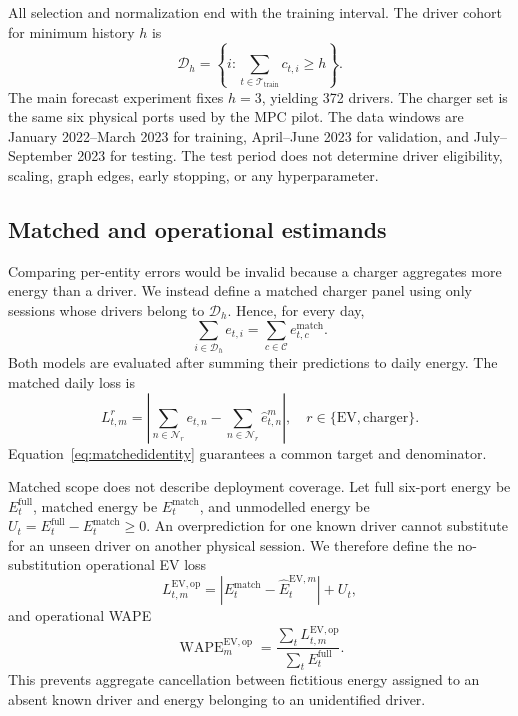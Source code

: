 \documentclass[11pt]{article}
\newcommand{\T}{\mathcal{T}}
\begin{document}
All selection and normalization end with the training interval.  The driver
cohort for minimum history \(h\) is
\begin{equation}
 \mathcal D_h=
 \left\{i:
 \sum_{t\in\T_{\mathrm{train}}}c_{t,i}\ge h
 \right\}.                                             \label{eq:drivercohort}
\end{equation}
The main forecast experiment fixes \(h=3\), yielding 372 drivers.  The charger
set is the same six physical ports used by the MPC pilot.  The data windows are
January 2022--March 2023 for training, April--June 2023 for validation, and
July--September 2023 for testing.  The test period does not determine driver
eligibility, scaling, graph edges, early stopping, or any hyperparameter.

\subsection{Matched and operational estimands}

Comparing per-entity errors would be invalid because a charger aggregates more
energy than a driver.  We instead define a matched charger panel using only
sessions whose drivers belong to \(\mathcal D_h\).  Hence, for every day,
\begin{equation}
 \sum_{i\in\mathcal D_h} e_{t,i}
 =
 \sum_{c\in\mathcal C} e^{\mathrm{match}}_{t,c}.          \label{eq:matchedidentity}
\end{equation}
Both models are evaluated after summing their predictions to daily energy.
The matched daily loss is
\begin{equation}
 L^{r}_{t,m}
 =
 \left|
 \sum_{n\in\mathcal N_r}e_{t,n}
 -
 \sum_{n\in\mathcal N_r}\widehat e^{m}_{t,n}
 \right|,
 \quad r\in\{\mathrm{EV},\mathrm{charger}\}.             \label{eq:matchedloss}
\end{equation}
Equation~\eqref{eq:matchedidentity} guarantees a common target and denominator.

Matched scope does not describe deployment coverage.  Let full six-port energy
be \(E^{\mathrm{full}}_t\), matched energy be
\(E^{\mathrm{match}}_t\), and unmodelled energy be
\(U_t=E^{\mathrm{full}}_t-E^{\mathrm{match}}_t\ge0\).
An overprediction for one known driver cannot substitute for an unseen driver
on another physical session.  We therefore define the no-substitution
operational EV loss
\begin{equation}
 L^{\mathrm{EV,op}}_{t,m}
 =
 \left|
 E^{\mathrm{match}}_t-\widehat E^{\mathrm{EV},m}_t
 \right|+U_t,                                          \label{eq:nosub}
\end{equation}
and operational WAPE
\begin{equation}
 \operatorname{WAPE}^{\mathrm{EV,op}}_m
 =
 \frac{\sum_tL^{\mathrm{EV,op}}_{t,m}}
 {\sum_tE^{\mathrm{full}}_t}.                           \label{eq:opwape}
\end{equation}
This prevents aggregate cancellation between fictitious energy assigned to an
absent known driver and energy belonging to an unidentified driver.
\end{document}
